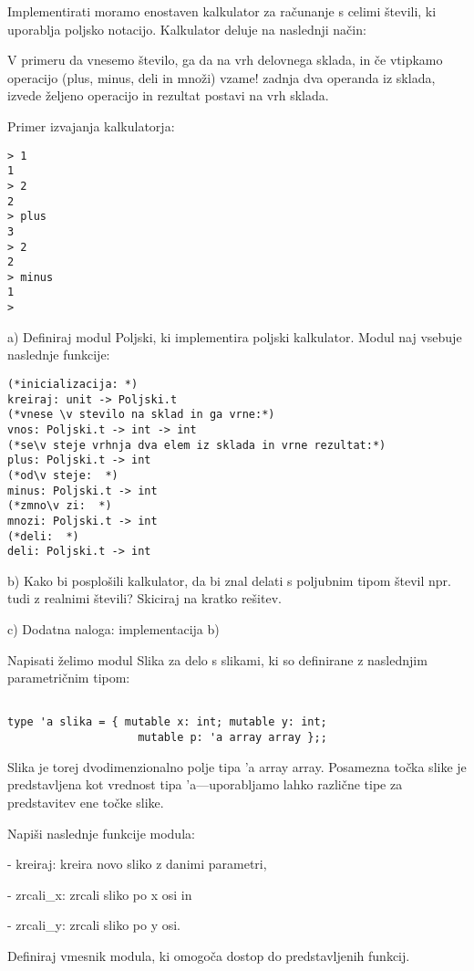 \begin{ex}
Implementirati moramo enostaven kalkulator za ra\v cunanje s celimi
\v stevili, ki uporablja poljsko notacijo. Kalkulator deluje na naslednji
na\v cin:

V primeru da vnesemo \v stevilo, ga da na vrh delovnega sklada, in \v ce
vtipkamo operacijo (plus, minus, deli in mno\v zi) vzame! zadnja dva
operanda iz sklada, izvede \v zeljeno operacijo in rezultat postavi na
vrh sklada.

Primer izvajanja kalkulatorja: 
\begin{lstlisting}
> 1 
1 
> 2 
2 
> plus 
3 
> 2 
2 
> minus 
1 
> 
\end{lstlisting}

a) Definiraj modul Poljski, ki implementira poljski kalkulator. Modul
naj vsebuje naslednje funkcije:

\begin{lstlisting}
(*inicializacija: *)
kreiraj: unit -> Poljski.t      
(*vnese \v stevilo na sklad in ga vrne:*)
vnos: Poljski.t -> int -> int   
(*se\v steje vrhnja dva elem iz sklada in vrne rezultat:*)
plus: Poljski.t -> int    
(*od\v steje:  *)
minus: Poljski.t -> int         
(*zmno\v zi:  *)
mnozi: Poljski.t -> int         
(*deli:  *)
deli: Poljski.t -> int          
\end{lstlisting}

b) Kako bi posplo\v sili kalkulator, da bi znal delati s poljubnim tipom \v stevil npr. tudi z realnimi \v stevili? Skiciraj na kratko re\v sitev. 

c) Dodatna naloga: implementacija b)  

\end{ex}
\begin{ex}
Napisati \v zelimo modul Slika za delo s slikami, ki so definirane z naslednjim parametri\v cnim tipom:

\begin{lstlisting}

type 'a slika = { mutable x: int; mutable y: int;
					mutable p: 'a array array };; 
\end{lstlisting}

Slika je torej dvodimenzionalno polje tipa 'a array array. Posamezna to\v cka slike je predstavljena kot vrednost tipa 'a---uporabljamo lahko razli\v cne tipe za predstavitev ene to\v cke slike.

Napi\v si naslednje funkcije modula:

- kreiraj: kreira novo sliko z danimi parametri,

- zrcali\_x: zrcali sliko po x osi in

- zrcali\_y: zrcali sliko po y osi.

Definiraj vmesnik modula, ki omogo\v ca dostop do predstavljenih funkcij.

\end{ex}
